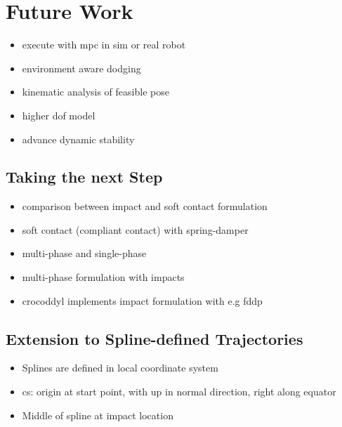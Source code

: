 \section{Future Work} \label{sec:futureWork}

\begin{itemize}
  \item execute with \acrshort{mpc} in sim or real robot
  \item environment aware dodging
  \item kinematic analysis of feasible pose
  \item higher \acrshort{dof} model
  \item advance dynamic stability
\end{itemize}

\subsection{Taking the next Step}
\begin{itemize}
  \item comparison between impact and soft contact formulation
  \item soft contact (compliant contact) with spring-damper
  \item multi-phase and single-phase
  \item multi-phase formulation with impacts
  \item \acrshort{crocoddyl} implements impact formulation with e.g \acrshort{fddp}
\end{itemize}

\subsection{Extension to Spline-defined Trajectories} \label{sec:eval:extension}
\begin{itemize}
  \item Splines are defined in local coordinate system
  \item cs: origin at start point, with up in normal direction, right along equator
  \item Middle of spline at impact location
\end{itemize}

